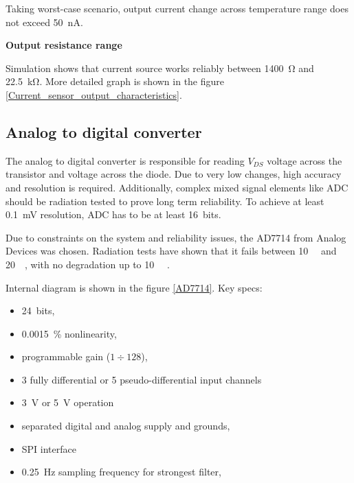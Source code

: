         Taking worst-case scenario, output current change across temperature range does not exceed \SI{50}{\nano\ampere}.

        \bigskip\textbf{Output resistance range}

        Simulation shows that current source works reliably between \SI{1400}{\ohm} and \SI{22.5}{\kilo\ohm}. More detailed graph is shown in the figure \ref{Current_sensor_output_characteristics}.

    \subsection{Analog to digital converter}
        The analog to digital converter is responsible for reading $V_{DS}$ voltage across the transistor and voltage across the diode. Due to very low changes, high accuracy and resolution is required. Additionally, complex mixed signal elements like ADC should be radiation tested to prove long term reliability. To achieve at least \SI{0.1}{\milli\volt} resolution, ADC has to be at least \SI{16}{bits}.

        Due to constraints on the system and reliability issues, the AD7714 from Analog Devices was chosen. Radiation tests have shown that it fails between \SI{10}{\kilo\rad} and \SI{20}{\kilo\rad}, with no degradation up to \SI{10}{\kilo\rad} \cite{ADC_radiation_tests}.

\newpage
        Internal diagram is shown in the figure \ref{AD7714}. Key specs:
        \begin{itemize}
            \item \SI{24}{bits},
            \item \SI{0.0015}{\percent} nonlinearity,
            \item programmable gain ($1 \div 128$),
            \item 3 fully differential or 5 pseudo-differential input channels
            \item \SI{3}{\volt} or \SI{5}{\volt} operation
            \item separated digital and analog supply and grounds,
            \item SPI interface
            \item \SI{0.25}{\hertz} sampling frequency for strongest filter,
        \end{itemize}

